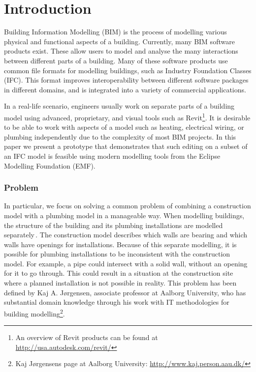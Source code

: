 

\setcounter{page}{1}
\section{Introduction}
Building Information Modelling (BIM) is the process of modelling various physical and functional aspects of a building. Currently, many BIM software products exist. These allow users to model and analyse the many interactions between different parts of a building. Many of these software products use common file formats for modelling buildings, such as Industry Foundation Classes (IFC). This format improves interoperability between different software packages in different domains, and is integrated into a variety of commercial applications.

In a real-life scenario, engineers usually work on separate parts of a building model using advanced, proprietary, and visual tools such as Revit\footnote{An overview of Revit products can be found at \url{http://usa.autodesk.com/revit/}}. It is desirable to be able to work with aspects of a model such as heating, electrical wiring, or plumbing independently due to the complexity of most BIM projects. In this paper we present a prototype that demonstrates that such editing on a subset of an IFC model is feasible using modern modelling tools from the Eclipse Modelling Foundation (EMF).

\subsubsection{Problem}
In particular, we focus on solving a common problem of combining a construction model with a plumbing model in a manageable way. When modelling buildings, the structure of the building and its plumbing installations are modelled separately\,\cite[pp. 19--20]{jorgensen10}. The construction model describes which walls are bearing and which walls have openings for installations. Because of this separate modelling, it is possible for plumbing installations to be inconsistent with the construction model. For example, a pipe could intersect with a solid wall, without an opening for it to go through. This could result in a situation at the construction site where a planned installation is not possible in reality. This problem has been defined by Kaj A. Jørgensen, associate professor at Aalborg University, who has substantial domain knowledge through his work with IT methodologies for building modelling\footnote{Kaj Jørgensens page at Aalborg University: \url{http://www.kaj.person.aau.dk/}}.


